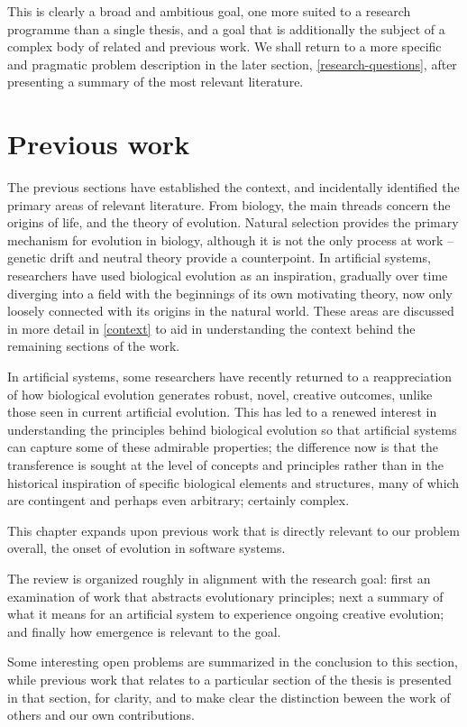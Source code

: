 \documentclass[]{report}
\begin{document}
This is clearly a broad and ambitious goal, one more suited to a research programme than a single thesis, and a goal that is additionally the subject of a complex body of related and previous work. We shall return to a more specific and pragmatic problem description in the later section, \ref{research-questions}, after presenting a summary of the most relevant literature.

\section{Previous work}
The previous sections have established the context, and incidentally identified the primary areas of relevant literature. From biology, the main threads concern the origins of life, and the theory of evolution. Natural selection provides the primary mechanism for evolution in biology, although it is not the only process at work -- genetic drift and neutral theory provide a counterpoint. In artificial systems, researchers have used biological evolution as an inspiration, gradually over time diverging into a field with the beginnings of its own motivating theory, now only loosely connected with its origins in the natural world. These areas are discussed in more detail in \ref{context} to aid in understanding the context behind the remaining sections of the work.

In artificial systems, some researchers have recently returned to a reappreciation of how biological evolution generates robust, novel, creative outcomes, unlike those seen in current artificial evolution. This has led to a renewed interest in understanding the principles behind biological evolution so that artificial systems can capture some of these admirable properties; the difference now is that the transference is sought at the level of concepts and principles rather than in the historical inspiration of specific biological elements and structures, many of which are contingent and perhaps even arbitrary; certainly complex.

This chapter expands upon previous work that is directly relevant to our problem overall, the onset of evolution in software systems. 

The review is organized roughly in alignment with the research goal: first an examination of work that abstracts evolutionary principles; next a summary of what it means for an artificial system to experience ongoing creative evolution; and finally how emergence is relevant to the goal.

Some interesting open problems are summarized in the conclusion to this section, while previous work that relates to a particular section of the thesis is presented in that section, for clarity, and to make clear the distinction beween the work of others and our own contributions.
\end{document}
